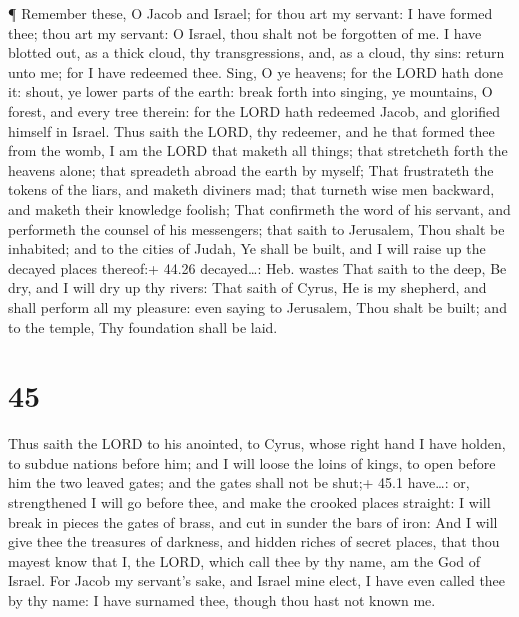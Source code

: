  ¶ Remember these, O Jacob and Israel; for thou art my
servant: I have formed thee; thou art my servant: O Israel, thou shalt
not be forgotten of me.  I have blotted out, as a thick
cloud, thy transgressions, and, as a cloud, thy sins: return unto me;
for I have redeemed thee.  Sing, O ye heavens; for the LORD
hath done it: shout, ye lower parts of the earth: break forth into
singing, ye mountains, O forest, and every tree therein: for the LORD
hath redeemed Jacob, and glorified himself in Israel.  Thus
saith the LORD, thy redeemer, and he that formed thee from the womb, I
am the LORD that maketh all things; that stretcheth forth the heavens
alone; that spreadeth abroad the earth by myself;  That
frustrateth the tokens of the liars, and maketh diviners mad; that
turneth wise men backward, and maketh their knowledge foolish;
 That confirmeth the word of his servant, and performeth
the counsel of his messengers; that saith to Jerusalem, Thou shalt be
inhabited; and to the cities of Judah, Ye shall be built, and I will
raise up the decayed places thereof:+ 44.26 decayed\ldots: Heb. wastes
 That saith to the deep, Be dry, and I will dry up thy
rivers:  That saith of Cyrus, He is my shepherd, and shall
perform all my pleasure: even saying to Jerusalem, Thou shalt be built;
and to the temple, Thy foundation shall be laid.

\hypertarget{section-44}{%
\section{45}\label{section-44}}

 Thus saith the LORD to his anointed, to Cyrus, whose right
hand I have holden, to subdue nations before him; and I will loose the
loins of kings, to open before him the two leaved gates; and the gates
shall not be shut;+ 45.1 have\ldots: or, strengthened  I
will go before thee, and make the crooked places straight: I will break
in pieces the gates of brass, and cut in sunder the bars of iron:
 And I will give thee the treasures of darkness, and hidden
riches of secret places, that thou mayest know that I, the LORD, which
call thee by thy name, am the God of Israel.  For Jacob my
servant's sake, and Israel mine elect, I have even called thee by thy
name: I have surnamed thee, though thou hast not known me.

